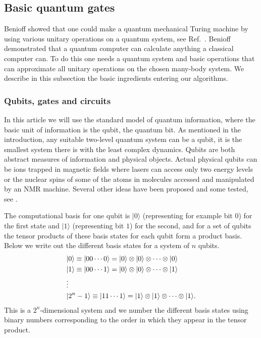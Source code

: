 \documentclass[aps,pra,twocolumn,floatfix]{revtex4}
\begin{document}
\subsection{Basic quantum  gates}

Benioff showed that one could make a quantum mechanical Turing machine
by using various  unitary operations on a quantum system, see Ref.~\cite{benioff}.
Benioff  demonstrated 
that a quantum computer can calculate anything a
classical computer can. To do this one needs a quantum system and
basic operations that can approximate all unitary operations
on the chosen many-body system. We describe in this subsection the basic ingredients entering 
our algorithms.

\subsubsection{Qubits, gates and circuits}
\label{sec:gates}
In this article we will use the standard model of quantum information,
where
the basic unit of information is the qubit, the quantum bit. 
As mentioned in the introduction, any
suitable 
two-level quantum system can be a qubit, 
it is the smallest system there is with the
least complex dynamics.
Qubits are both abstract measures of information and physical objects.
Actual physical qubits can be ions trapped in magnetic fields where
lasers can access only two energy levels or  the nuclear spins of some of
the atoms in molecules accessed and manipulated by an NMR machine.
Several other ideas have been proposed and some tested, see
\cite{nielsen2000}. 

The computational basis for one qubit is ${\ensuremath{|0\rangle}}$ (representing for example bit $0$) 
for the first state
and ${\ensuremath{|1\rangle}}$ (representing bit $1$) for the second, and for a set of qubits  
the tensor products of
these basis states for each qubit form a product basis. Below we write out the different
basis states for a system of $n$ qubits.
\begin{eqnarray}
\label{eq:compBasis}
&{\ensuremath{|0\rangle}} \equiv {\ensuremath{|00\cdots 0\rangle}} =
      {\ensuremath{|0\rangle}} \otimes {\ensuremath{| 0\rangle}} \otimes
          \cdots 
\otimes {\ensuremath{|0\rangle}} 
\notag \\
&{\ensuremath{|1\rangle}} \equiv {\ensuremath{|00\cdots 1\rangle}} =
    {\ensuremath{|0\rangle}} \otimes {\ensuremath{| 0\rangle}} \otimes
        \cdots 
\otimes {\ensuremath{|1\rangle}} 
\notag \\
&\vdots \notag \\
&{\ensuremath{|2^n-1\rangle}} \equiv {\ensuremath{|11\cdots 1\rangle}} =
    {\ensuremath{|1\rangle}} \otimes {\ensuremath{| 1\rangle}} \otimes 
\cdots \otimes {\ensuremath{|1 \rangle}}.
\notag \\
\end{eqnarray}
This is a $2^n$-dimensional system and we number the different basis
states using binary numbers corresponding to the order in which they appear in the
tensor product.
\end{document}
